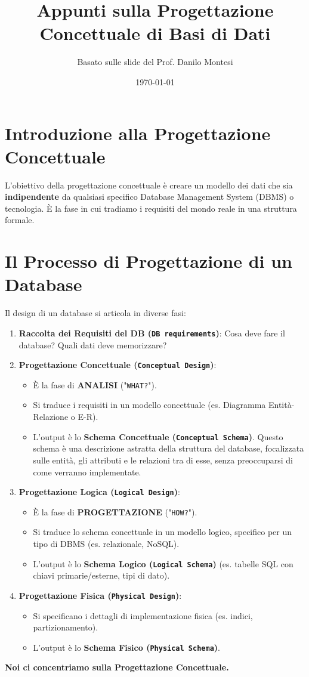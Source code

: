 \documentclass{article}
\title{Appunti sulla Progettazione Concettuale di Basi di Dati}
\author{Basato sulle slide del Prof. Danilo Montesi}
\date{\today}
\begin{document}
	
	\maketitle
	\tableofcontents
	\newpage
	
	\section{Introduzione alla Progettazione Concettuale}
	L'obiettivo della progettazione concettuale è creare un modello dei dati che sia \textbf{indipendente} da qualsiasi specifico Database Management System (DBMS) o tecnologia. È la fase in cui tradiamo i requisiti del mondo reale in una struttura formale.
	
	\section{Il Processo di Progettazione di un Database}
	Il design di un database si articola in diverse fasi:
	\begin{enumerate}
		\item \textbf{Raccolta dei Requisiti del DB (\texttt{DB requirements})}: Cosa deve fare il database? Quali dati deve memorizzare?
		\item \textbf{Progettazione Concettuale (\texttt{Conceptual Design})}:
		\begin{itemize}
			\item È la fase di \textbf{ANALISI} ("\texttt{WHAT?}").
			\item Si traduce i requisiti in un modello concettuale (es. Diagramma Entità-Relazione o E-R).
			\item L'output è lo \textbf{Schema Concettuale (\texttt{Conceptual Schema})}. Questo schema è una descrizione astratta della struttura del database, focalizzata sulle entità, gli attributi e le relazioni tra di esse, senza preoccuparsi di come verranno implementate.
		\end{itemize}
		\item \textbf{Progettazione Logica (\texttt{Logical Design})}:
		\begin{itemize}
			\item È la fase di \textbf{PROGETTAZIONE} ("\texttt{HOW?}").
			\item Si traduce lo schema concettuale in un modello logico, specifico per un tipo di DBMS (es. relazionale, NoSQL).
			\item L'output è lo \textbf{Schema Logico (\texttt{Logical Schema})} (es. tabelle SQL con chiavi primarie/esterne, tipi di dato).
		\end{itemize}
		\item \textbf{Progettazione Fisica (\texttt{Physical Design})}:
		\begin{itemize}
			\item Si specificano i dettagli di implementazione fisica (es. indici, partizionamento).
			\item L'output è lo \textbf{Schema Fisico (\texttt{Physical Schema})}.
		\end{itemize}
	\end{enumerate}
	\textbf{Noi ci concentriamo sulla Progettazione Concettuale.}
	
\end{document}
